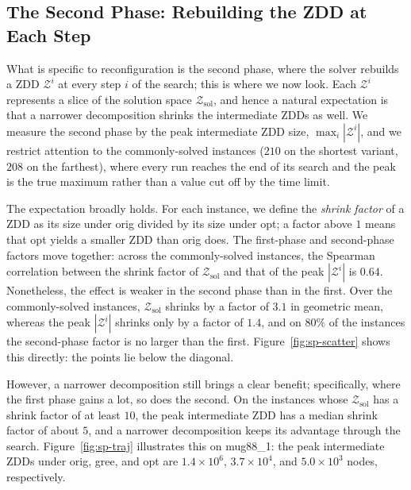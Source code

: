 \documentclass[conference]{IEEEtran}
\newcommand{\Z}{\mathcal{Z}}
\newcommand{\zsol}{\mathcal{Z}_{\mathrm{sol}}}
\newcommand{\OrigDecom}{\textsf{orig}\xspace}
\newcommand{\HeurDecom}{\textsf{gree}\xspace}
\newcommand{\OptDecom}{\textsf{opt}\xspace}
\begin{document}
\subsection{The Second Phase: Rebuilding the ZDD at Each Step}
\label{subsec:secondphase}
What is specific to reconfiguration is the second phase, where the solver rebuilds a
ZDD $\Z^i$ at every step $i$ of the search; this is where we now look. Each $\Z^i$
represents a slice of the solution space $\zsol$, and hence a natural expectation is
that a narrower decomposition shrinks the intermediate ZDDs as well. 
We measure the second phase by the peak intermediate ZDD size,
$\max_i|\Z^i|$, and we restrict attention to the commonly-solved instances ($210$ on
the shortest variant, $208$ on the farthest), where every run reaches the end of its
search and the peak is the true maximum rather than a value cut off by the time
limit.

The expectation broadly holds. For each instance, we define the \emph{shrink
factor} of a ZDD as its size under \OrigDecom divided by its size under
\OptDecom; a factor above $1$ means that \OptDecom yields a smaller ZDD than
\OrigDecom does.
The first-phase and second-phase factors move together: across the commonly-solved instances, the
Spearman correlation between the shrink factor of $\zsol$ and that of the peak
$|\Z^i|$ is $0.64$. Nonetheless, the effect is weaker in the second phase than in
the first. Over the commonly-solved instances, $\zsol$ shrinks by a factor of
$3.1$ in geometric mean, whereas the peak $|\Z^i|$ shrinks only by a factor of
$1.4$, and on $80\%$ of the instances the second-phase factor is no larger than
the first. Figure~\ref{fig:sp-scatter} shows this directly: the points lie below
the diagonal. 

However, a narrower decomposition still brings a clear benefit; specifically,
where the first phase gains a lot, so does the second. On the instances whose
$\zsol$ has a shrink factor of at least $10$, the peak intermediate ZDD has a
median shrink factor of about $5$, and a narrower decomposition keeps its
advantage through the search. Figure~\ref{fig:sp-traj} illustrates this on
\textsf{mug88\_1}: the peak intermediate ZDDs under \OrigDecom, \HeurDecom, and
\OptDecom are $1.4\times10^{6}$, $3.7\times10^{4}$, and $5.0\times10^{3}$ nodes,
respectively.
\end{document}
